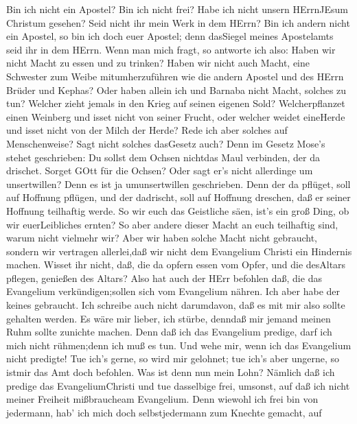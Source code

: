  Bin ich nicht ein Apostel? Bin ich nicht frei? Habe ich
nicht unsern HErrnJEsum Christum gesehen? Seid nicht ihr mein Werk in
dem HErrn?  Bin ich andern nicht ein Apostel, so bin ich
doch euer Apostel; denn dasSiegel meines Apostelamts seid ihr in dem
HErrn.  Wenn man mich fragt, so antworte ich also:
 Haben wir nicht Macht zu essen und zu trinken? 
Haben wir nicht auch Macht, eine Schwester zum Weibe mitumherzuführen
wie die andern Apostel und des HErrn Brüder und Kephas? 
Oder haben allein ich und Barnaba nicht Macht, solches zu tun?
 Welcher zieht jemals in den Krieg auf seinen eigenen Sold?
Welcherpflanzet einen Weinberg und isset nicht von seiner Frucht, oder
welcher weidet eineHerde und isset nicht von der Milch der Herde?
 Rede ich aber solches auf Menschenweise? Sagt nicht solches
dasGesetz auch?  Denn im Gesetz Mose's stehet geschrieben:
Du sollst dem Ochsen nichtdas Maul verbinden, der da drischet. Sorget
GOtt für die Ochsen?  Oder sagt er's nicht allerdinge um
unsertwillen? Denn es ist ja umunsertwillen geschrieben. Denn der da
pflüget, soll auf Hoffnung pflügen, und der dadrischt, soll auf Hoffnung
dreschen, daß er seiner Hoffnung teilhaftig werde.  So wir
euch das Geistliche säen, ist's ein groß Ding, ob wir euerLeibliches
ernten?  So aber andere dieser Macht an euch teilhaftig
sind, warum nicht vielmehr wir? Aber wir haben solche Macht nicht
gebraucht, sondern wir vertragen allerlei,daß wir nicht dem Evangelium
Christi ein Hindernis machen.  Wisset ihr nicht, daß, die
da opfern essen vom Opfer, und die desAltars pflegen, genießen des
Altars?  Also hat auch der HErr befohlen daß, die das
Evangelium verkündigen;sollen sich vom Evangelium nähren. 
Ich aber habe der keines gebraucht. Ich schreibe auch nicht darumdavon,
daß es mit mir also sollte gehalten werden. Es wäre mir lieber, ich
stürbe, denndaß mir jemand meinen Ruhm sollte zunichte machen.
 Denn daß ich das Evangelium predige, darf ich mich nicht
rühmen;denn ich muß es tun. Und wehe mir, wenn ich das Evangelium nicht
predigte!  Tue ich's gerne, so wird mir gelohnet; tue ich's
aber ungerne, so istmir das Amt doch befohlen.  Was ist
denn nun mein Lohn? Nämlich daß ich predige das EvangeliumChristi und
tue dasselbige frei, umsonst, auf daß ich nicht meiner Freiheit
mißbraucheam Evangelium.  Denn wiewohl ich frei bin von
jedermann, hab' ich mich doch selbstjedermann zum Knechte gemacht, auf
